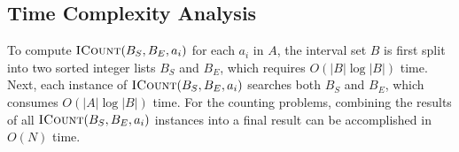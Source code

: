 \documentclass{bioinfo}
\begin{document}
\begin{enumerate}
	\end{enumerate}
	


	\subsection{Time Complexity Analysis}

	To compute $\textsc{ICount}(B_S,B_E,a_i)$ for each $a_i$ in $A$, the interval
	set $B$ is first split into two sorted integer lists $B_S$ and $B_E$,
	which requires $O(|B| \log |B|)$ time.  Next, each instance of
	$\textsc{ICount}(B_S,B_E,a_i)$ searches both $B_S$ and $B_E$, which consumes
	$O(|A| \log |B|)$ time.  For the counting problems, combining the
	results of all $\textsc{ICount}(B_S,B_E,a_i)$ instances into a final result can
	be accomplished in $O(N)$ time.  
	
\end{document}
